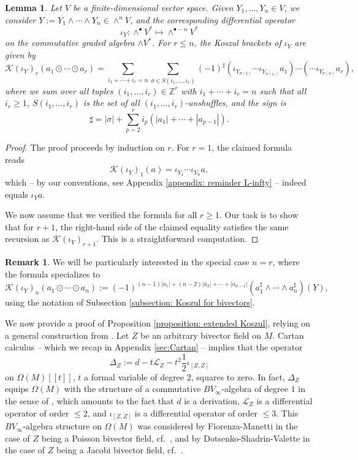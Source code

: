 \documentclass[11pt,thmsa]{amsart}
\newtheorem{lemma}[theorem]{Lemma}
\theoremstyle{definition}
\newtheorem{remark}[theorem]{Remark}
\newcommand{\Lie}{\mathcal{L}}
\newcommand{\Koszul}{\mathcal{K}}
\begin{document}
{\begin{lemma}\label{lemma: Koszul brackets for contraction}
Let $V$ be a finite-dimensional vector space.
Given $Y_1,\dots,Y_n \in V$, we consider $Y:=Y_1\wedge \cdots \wedge Y_n \in \wedge^n V$, and the corresponding differential operator
$$ \iota_Y :\wedge^\bullet V^* \mapsto \wedge^{\bullet-n} V^*$$
on the commutative graded algebra $\wedge V^*$.
For $r\le n$, the Koszul brackets of $\iota_Y$ are given by
$$ \Koszul(\iota_Y)_r(a_1\odot \cdots \odot a_r)=\sum_{i_1+\cdots +i_r=n} \sum_{\sigma \in S(i_1,\dots,i_r)}(-1)^\sharp (\iota_{Y_{\sigma(1)}}\cdots \iota_{Y_{\sigma(i_1)}}a_1)\cdots (\cdots \iota_{Y_{\sigma(n)}}a_r),$$
where we sum over all tuples $(i_1,\dots,i_r) \in \mathbb{Z}^r$ with
$i_1+\cdots+ i_r=n$ such that all $i_r \ge 1$,
$S(i_1,\dots,i_r)$ is the set of all $(i_1,\dots,i_r)$-unshuffles, and the sign is
$$ \sharp = |\sigma| + \sum_{p=2}^r i_p(|a_1|+\cdots + |a_{p-1}|).$$
\end{lemma}

\begin{proof}
The proof proceeds by induction on $r$. 
For $r=1$, the claimed formula reads
$$\Koszul(\iota_Y)_1(a)=\iota_{Y_1}\cdots \iota_{Y_n} a,$$
which -- by our conventions, see Appendix \ref{appendix: reminder L-infty} -- indeed equals $\iota_Y a$.

We now assume that we verified the formula for all $r\ge 1$.
Our task is to show that for $r+1$, the right-hand side 
of the claimed equality satisfies the same recursion as
$\Koszul(\iota_Y)_{r+1}$.
This is a straightforward computation.
\end{proof}

\begin{remark}\label{remark: Koszul}
We will be particularly interested in the special case $n=r$, where the formula specializes to
$$\Koszul(\iota_Y)_n(a_1\odot \cdots \odot a_n):= (-1)^{(n-1)|a_1|+(n-2)|a_2|+\cdots + |a_{n-1}|} (a_1^\sharp \wedge \cdots \wedge a_n^\sharp)(Y),$$
using the notation of Subsection \ref{subsection: Koszul for bivectors}.
\end{remark}

We now provide a proof of Proposition \ref{proposition: extended Koszul}, relying on a
general construction from \cite{Kravchenko,Voronov1}.
Let $Z$ be an arbitrary bivector field on $M$. Cartan calculus -- which we recap in Appendix \ref{sec:Cartan} -- implies that the operator
$$\Delta_Z:= d - t \Lie_Z - t^2 \frac{1}{2} \iota_{[Z,Z]}$$
on $\Omega(M)[[t]]$, $t$ a formal variable of degree $2$, squares to zero. In fact, $\Delta_Z$ equips $\Omega(M)$ with the structure of a commutative $BV_\infty$-algebra of degree $1$ in the sense of \cite{Kravchenko}, {which amounts to the fact that $d$ is a derivation, $\Lie_Z$ is a differential operator of order $\le 2$,
and $\iota_{[Z,Z]}$ is a differential operator of order $\le 3$.}
This $BV_\infty$-algebra structure on $\Omega(M)$ was considered by Fiorenza-Manetti
in the case of $Z$ being a Poisson bivector field, cf.~\cite{Fiorenza-Manetti},
and by Dotsenko-Shadrin-Valette in the case of $Z$ being a Jacobi bivector field, cf.~\cite{DSV}.


}
\end{document}
